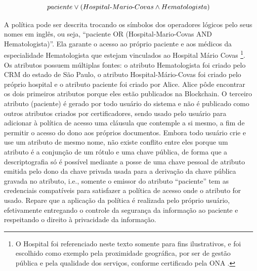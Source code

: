 \documentclass[a4paper,11pt]{article}
\begin{document}
\[paciente \vee (Hospital\textnormal{-}Mario\textnormal{-}Covas \wedge Hematologista)\] %

A política pode ser descrita trocando os símbolos dos operadores lógicos pelo seus nomes em inglês, ou seja, ``paciente OR (Hospital-Mario-Covas AND Hematologista)''.
Ela garante o acesso ao próprio paciente e aos médicos da especialidade Hematologista que estejam vinculados ao Hospital Mário Covas
\footnote{O Hospital foi referenciado neste texto somente para fins ilustrativos, e foi escolhido como exemplo pela proximidade geográfica, por ser de gestão pública e pela qualidade dos serviços, conforme certificado pela ONA \cite{ONA2020}.}.
Os atributos possuem múltiplas fontes: o atributo Hematologista foi criado pelo CRM do estado de São Paulo, o atributo Hospital-Mário-Covas foi criado pelo próprio hospital e o atributo paciente foi criado por Alice.
Alice pôde encontrar os dois primeiros atributos porque eles estão publicados na Blockchain.
O terceiro atributo (paciente) é gerado por todo usuário do sistema e não é publicado como outros atributos criados por certificadores, sendo usado pelo usuário para adicionar à política de acesso uma cláusula que contemple a si mesmo, a fim de permitir o acesso do dono aos próprios documentos.
Embora todo usuário crie e use um atributo de mesmo nome, não existe conflito entre eles porque um atributo é a conjunção de um rótulo e uma chave pública, de forma que a descriptografia só é possível mediante a posse de uma chave pessoal de atributo emitida pelo dono da chave privada usada para a derivação da chave pública gravada no atributo, i.e., somente o emissor do atributo ``paciente'' tem as credenciais compatíveis para satisfazer a política de acesso onde o atributo for usado.
Repare que a aplicação da política é realizada pelo próprio usuário, efetivamente entregando o controle da segurança da informação ao paciente e respeitando o direito à privacidade da informação.
\end{document}
